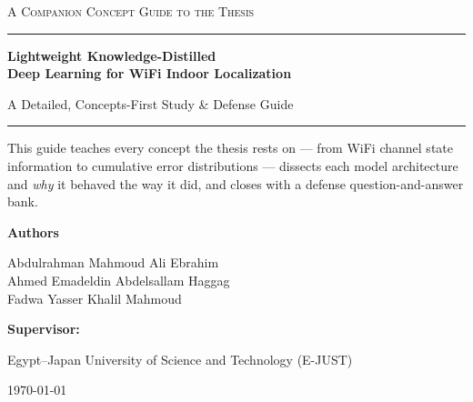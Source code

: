 \documentclass[12pt,a4paper,oneside]{report}
\begin{document}
\begin{titlepage}
\centering
\vspace*{2.2cm}
{\scshape\large A Companion Concept Guide to the Thesis\par}
\vspace{0.4cm}
{\color{accent}\rule{\linewidth}{1.2pt}}\par
\vspace{0.8cm}
{\huge\bfseries Lightweight Knowledge-Distilled\\[0.2em]
Deep Learning for WiFi Indoor Localization\par}
\vspace{0.6cm}
{\Large A Detailed, Concepts-First Study \& Defense Guide\par}
\vspace{0.3cm}
{\color{accent}\rule{\linewidth}{1.2pt}}\par
\vspace{1.4cm}

{\large
This guide teaches every concept the thesis rests on --- from WiFi channel
state information to cumulative error distributions --- dissects each model
architecture and \emph{why} it behaved the way it did, and closes with a
defense question-and-answer bank.\par}
\vspace{2.0cm}

{\large\bfseries Authors\par}
\vspace{0.2cm}
{\large Abdulrahman Mahmoud Ali Ebrahim \\
Ahmed Emadeldin Abdelsallam Haggag \\
Fadwa Yasser Khalil Mahmoud \par}
\vspace{1.0cm}
{\large\textbf{Supervisor:} \supervisorname\ \par}
\vspace{0.2cm}
{\large Egypt--Japan University of Science and Technology (E-JUST)\par}
\vfill
{\large \today\par}
\end{titlepage}



\tableofcontents
\listoffigures
\clearpage









\appendix

\end{document}
